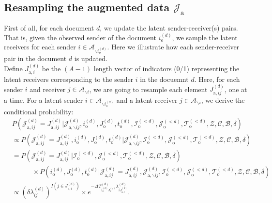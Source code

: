 \documentclass[a4paper]{article}
\begin{document}
    \subsection{Resampling the augmented data $\mathcal{J}_{\mbox{a}}$} \label{subsec: Data augmentation}
      First of all, for each document $d$, we update the latent sender-receiver(s) pairs. That is, given the observed sender of the document $i_o^{(d)}$, we sample the latent receivers for each sender $i \in \mathcal{A}_{\backslash i_o^{(d)}}$. Here we illustrate how each sender-receiver pair in the document $d$ is updated.\\\newline
      Define ${J}^{(d)}_{\mbox{a}, i}$ be the $(A-1)$ length vector of indicators (0/1) representing the latent receivers corresponding to the sender $i$ in the docuemnt $d$. Here, for each sender $i$ and receiver  $j \in \mathcal{A}_{\backslash i}$, we are going to resample each element ${J}^{(d)}_{\mbox{a}, ij}$, one at a time. For a latent sender $i \in \mathcal{A}_{\backslash i_o^{(d)}}$ and a latent receiver $j \in \mathcal{A}_{\backslash i}$, we derive the conditional probability:\\
      \begin{equation}
      \begin{aligned}
      &P(\mathcal{J}^{(d)}_{\mbox{a}, ij} = {J}^{(d)}_{\mbox{a}, ij}|\mathcal{J}^{(d)}_{\mbox{a}, \backslash ij},   i^{(d)}_{\mbox{o}}, J^{(d)}_{\mbox{o}}, t^{(d)}_{\mbox{o}}, \mathcal{I}^{(<d)}_{\mbox{o}}, \mathcal{J}^{(<d)}_{\mbox{o}}, \mathcal{T}^{(<d)}_{\mbox{o}}, \mathcal{Z}, \mathcal{C}, \mathcal{B}, \delta)\\&\propto P(\mathcal{J}^{(d)}_{\mbox{a}, ij} ={J}^{(d)}_{\mbox{a}, ij}, i^{(d)}_{\mbox{o}}, J^{(d)}_{\mbox{o}}, t^{(d)}_{\mbox{o}}| \mathcal{J}^{(d)}_{\mbox{a}, \backslash ij}, \mathcal{I}^{(<d)}_{\mbox{o}}, \mathcal{J}^{(<d)}_{\mbox{o}}, \mathcal{T}^{(<d)}_{\mbox{o}}, \mathcal{Z}, \mathcal{C}, \mathcal{B}, \delta)
      \\&= P(\mathcal{J}^{(d)}_{\mbox{a}, ij} ={J}^{(d)}_{\mbox{a}, ij}| \mathcal{I}^{(<d)}_{\mbox{o}}, \mathcal{J}^{(<d)}_{\mbox{o}}, \mathcal{T}^{(<d)}_{\mbox{o}}, \mathcal{Z}, \mathcal{C}, \mathcal{B}, \delta)\\&\quad\quad\quad\times P(i^{(d)}_{\mbox{o}}, J^{(d)}_{\mbox{o}}, t^{(d)}_{\mbox{o}}| \mathcal{J}^{(d)}_{\mbox{a}, ij} ={J}^{(d)}_{\mbox{a}, ij},\mathcal{J}^{(d)}_{\mbox{a}, \backslash ij},  \mathcal{I}^{(<d)}_{\mbox{o}}, \mathcal{J}^{(<d)}_{\mbox{o}}, \mathcal{T}^{(<d)}_{\mbox{o}}, \mathcal{Z}, \mathcal{C}, \mathcal{B}, \delta)\\&  \propto {(\delta\lambda^{(d)}_{ij})^{I(j \in J^{(d)}_{\mbox{a}, i})}}\times  e^{-\Delta T^{(d)}_{i_o^{(d)}J_o^{(d)}}\lambda^{(d)}_{iJ^{(d)}_{\mbox{a}, i}}}.
      \end{aligned}
      \end{equation}
\end{document}
